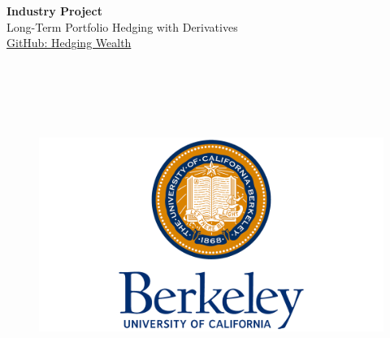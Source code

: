 \begin{titlepage}
    \begin{center}
    {\fontsize{25}{40}\selectfont \bfseries Industry Project} 
    \\\vspace{15pt}
    {\LARGE Long-Term Portfolio Hedging with Derivatives} \\
    \href{https://github.com/StanPyzhikin/BoA_Berkeley_MFE}{GitHub: Hedging Wealth}

    \vspace{20pt}
    \textbf{} \\
    \textbf{} \\
    \textbf{} \\
    \textbf{} \\
    \textbf{}
    \vspace{8pt}
    \vspace{50pt}
    \begin{figure}[h]
        \centering
        \includegraphics[width=.95\linewidth]{img/UC-Berkeley-Emblem.png}
    \end{figure}
    
    \end{center}
\end{titlepage}